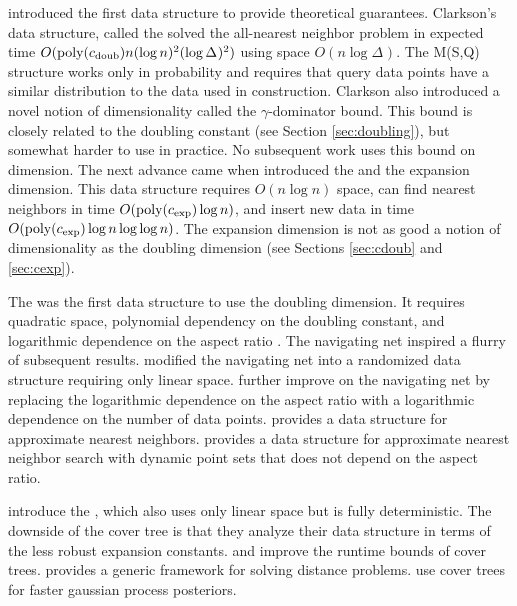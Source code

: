 \documentclass[thesis.tex]{subfiles}
\newcommand{\aspect}[1]{\Delta_{#1}}
\newcommand{\cexp}{c_\textnormal{exp}}
\newcommand{\cdoub}{c_\textnormal{doub}}
\newcommand{\poly}[1]{\text{poly}(#1)}
\begin{document}
\cite{clarkson1997nearest} introduced the first data structure to provide theoretical guarantees.
Clarkson's data structure, called the  solved the all-nearest neighbor problem in expected time $O(\poly{\cdoub}n(\log n)^2(\log \aspect{})^2)$ using space $O(n\log\aspect{})$.
The M(S,Q) structure works only in probability
and requires that query data points have a similar distribution to the data used in construction.
Clarkson also introduced a novel notion of dimensionality called the $\gamma$-dominator bound.
This bound is closely related to the doubling constant (see Section \ref{sec:doubling}),
but somewhat harder to use in practice.
No subsequent work uses this bound on dimension.
The next advance came when \citet{karger2002finding} introduced the  and the expansion dimension. 
This data structure requires $O(n\log n)$ space, 
can find nearest neighbors in time $O(\poly\cexp\log n)$,
and insert new data in time $O(\poly\cexp\log n \log \log n)$.
The expansion dimension is not as good a notion of dimensionality as the doubling dimension
(see Sections \ref{sec:cdoub} and \ref{sec:cexp}).

The  was the first data structure to use the doubling dimension.
It requires quadratic space, 
polynomial dependency on the doubling constant, 
and logarithmic dependence on the aspect ratio \citep{krauthgamer2004navigating}.
The navigating net inspired a flurry of subsequent results.
\citet{hildrum2004note} modified the navigating net into a randomized data structure requiring only linear space.
\cite{krauthgamer2005black} further improve on the navigating net by replacing the logarithmic dependence on the aspect ratio with a logarithmic dependence on the number of data points.
\cite{har2006fast} provides a data structure for approximate nearest neighbors.
\cite{cole2006searching} provides a data structure for approximate nearest neighbor search with dynamic point sets that does not depend on the aspect ratio.

\citet{beygelzimer2006cover} introduce the ,
which also uses only linear space but is fully deterministic.
The downside of the cover tree is that they analyze their data structure in terms of the less robust expansion constants.
\cite{ram2009linear} and \cite{curtin2015plug} improve the runtime bounds of cover trees.
\cite{curtin2013tree} provides a generic framework for solving distance problems.
\cite{moore2014fast} use cover trees for faster gaussian process posteriors.
\end{document}
